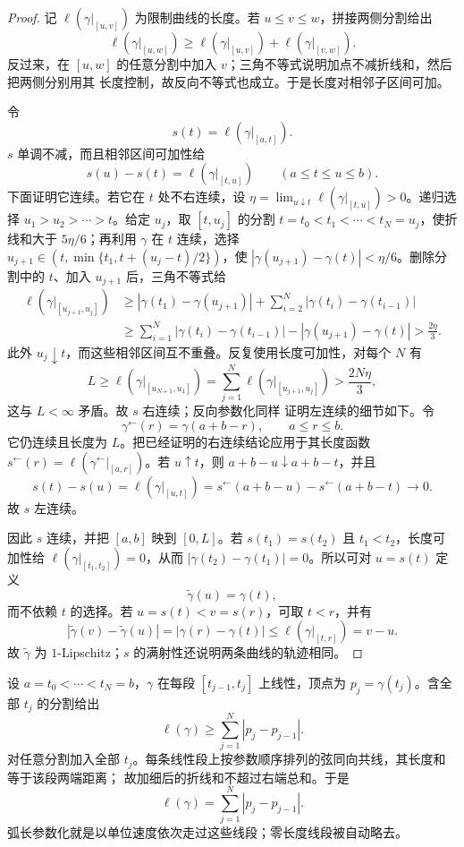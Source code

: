 \begin{proof}
记 $\ell(\gamma|_{[u,v]})$ 为限制曲线的长度。若 $u\le v\le w$，拼接两侧分割给出
\[
 \ell(\gamma|_{[u,w]})
 \ge\ell(\gamma|_{[u,v]})+\ell(\gamma|_{[v,w]}).
\]
反过来，在 $[u,w]$ 的任意分割中加入 $v$；三角不等式说明加点不减折线和，然后把两侧分别用其
长度控制，故反向不等式也成立。于是长度对相邻子区间可加。

令
\[
 s(t)=\ell(\gamma|_{[a,t]}).
\]
$s$ 单调不减，而且相邻区间可加性给
\[
 s(u)-s(t)=\ell(\gamma|_{[t,u]})\qquad(a\le t\le u\le b).
\]
下面证明它连续。若它在 $t$ 处不右连续，设
$\eta=\lim_{u\downarrow t}\ell(\gamma|_{[t,u]})>0$。递归选择
$u_1>u_2>\cdots>t$。给定 $u_j$，取 $[t,u_j]$ 的分割
$t=t_0<t_1<\cdots<t_N=u_j$，使折线和大于 $5\eta/6$；再利用 $\gamma$ 在 $t$ 连续，选择
$u_{j+1}\in(t,\min\{t_1,t+(u_j-t)/2\})$，使
$|\gamma(u_{j+1})-\gamma(t)|<\eta/6$。删除分割中的 $t$、加入 $u_{j+1}$ 后，三角不等式给
\[
\begin{aligned}
 \ell(\gamma|_{[u_{j+1},u_j]})
 &\ge |\gamma(t_1)-\gamma(u_{j+1})|
      +\sum_{i=2}^N|\gamma(t_i)-\gamma(t_{i-1})|\\
 &\ge \sum_{i=1}^N|\gamma(t_i)-\gamma(t_{i-1})|
      -|\gamma(u_{j+1})-\gamma(t)|
 >\frac{2\eta}{3}.
\end{aligned}
\]
此外 $u_j\downarrow t$，而这些相邻区间互不重叠。反复使用长度可加性，对每个 $N$ 有
\[
 L\ge \ell(\gamma|_{[u_{N+1},u_1]})
 =\sum_{j=1}^N\ell(\gamma|_{[u_{j+1},u_j]})
 >\frac{2N\eta}{3},
\]
这与 $L<\infty$ 矛盾。故 $s$ 右连续；反向参数化同样
证明左连续的细节如下。令
\[
 \gamma^{\leftarrow}(r)=\gamma(a+b-r),\qquad a\le r\le b.
\]
它仍连续且长度为 $L$。把已经证明的右连续结论应用于其长度函数
$s^{\leftarrow}(r)=\ell(\gamma^{\leftarrow}|_{[a,r]})$。若 $u\uparrow t$，则
$a+b-u\downarrow a+b-t$，并且
\[
 s(t)-s(u)
 =\ell(\gamma|_{[u,t]})
 =s^{\leftarrow}(a+b-u)-s^{\leftarrow}(a+b-t)\longrightarrow0.
\]
故 $s$ 左连续。

因此 $s$ 连续，并把 $[a,b]$ 映到 $[0,L]$。若 $s(t_1)=s(t_2)$ 且 $t_1<t_2$，长度可加性给
$\ell(\gamma|_{[t_1,t_2]})=0$，从而
$|\gamma(t_2)-\gamma(t_1)|=0$。所以可对 $u=s(t)$ 定义
\[
 \widetilde\gamma(u)=\gamma(t),
\]
而不依赖 $t$ 的选择。若 $u=s(t)<v=s(r)$，可取 $t<r$，并有
\[
 |\widetilde\gamma(v)-\widetilde\gamma(u)|
 =|\gamma(r)-\gamma(t)|
 \le\ell(\gamma|_{[t,r]})=v-u.
\]
故 $\widetilde\gamma$ 为 $1$-Lipschitz；$s$ 的满射性还说明两条曲线的轨迹相同。
\end{proof}

\begin{example}[折线路径的长度]\label{ex:2-4-3-polygonal}
设 $a=t_0<\cdots<t_N=b$，$\gamma$ 在每段 $[t_{j-1},t_j]$ 上线性，顶点为
$p_j=\gamma(t_j)$。含全部 $t_j$ 的分割给出
\[
 \ell(\gamma)\ge\sum_{j=1}^N|p_j-p_{j-1}|.
\]
对任意分割加入全部 $t_j$。每条线性段上按参数顺序排列的弦同向共线，其长度和等于该段两端距离；
故加细后的折线和不超过右端总和。于是
\[
 \ell(\gamma)=\sum_{j=1}^N|p_j-p_{j-1}|.
\]
弧长参数化就是以单位速度依次走过这些线段；零长度线段被自动略去。
\end{example}

